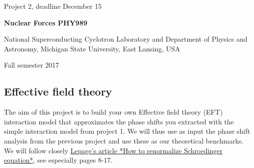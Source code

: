 \documentclass[%
oneside,                 %
final,                   %
10pt]{article}
\begin{document}

\newcommand{\exercisesection}[1]{\subsection*{#1}}






\thispagestyle{empty}

\begin{center}
{\LARGE\bf
\begin{spacing}{1.25}
Project 2, deadline  December 15
\end{spacing}
}
\end{center}


\begin{center}
{\bf Nuclear Forces PHY989}
\end{center}

    \begin{center}
\centerline{{\small National Superconducting Cyclotron Laboratory and Department of Physics and Astronomy, Michigan State University, East Lansing, USA}}
\end{center}
    

\begin{center}
Fall semester 2017
\end{center}

\vspace{1cm}


\subsection*{Effective field theory}

The aim of this project is to build your own Effective field theory
(EFT) interaction model that approximates the phase shifts you
extracted with the simple interaction model from project 1. We will
thus use as input the phase shift analysis from the previous project
and use these as our theoretical benchmarks.  We will follow closely
\href{{https://arxiv.org/abs/nucl-th/9706029}}{Lepage's article *How to renormalize Schroedinger
equation*}, see especially
pages 8-17.
\end{document}
